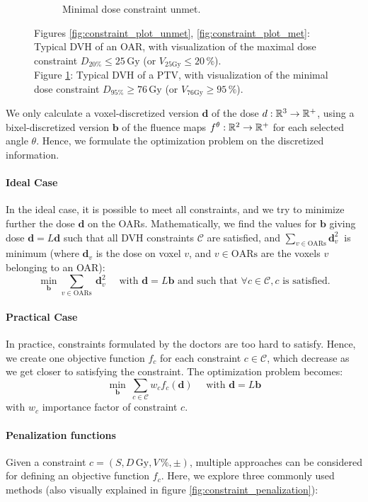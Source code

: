 \begin{figure}
\begin{subfigure}{0.32\textwidth}
		\caption{Minimal dose constraint unmet.}
		\label{fig:constraint_plot_min}
	\end{subfigure}
	\caption*{
		Figures \ref{fig:constraint_plot_unmet}, \ref{fig:constraint_plot_met}:
		Typical DVH of an OAR, with visualization of the maximal dose constraint $D_{20\%} \leq 25\,\text{Gy}$ (or $V_{25\text{Gy}} \leq 20\,\%$).\\
		Figure \ref{fig:constraint_plot_min}:
		Typical DVH of a PTV, with visualization of the minimal dose constraint $D_{95\%} \geq 76\,\text{Gy}$ (or $V_{76\text{Gy}} \geq 95\,\%$).
	}
	\label{fig:constraint_plot}
\end{figure}

We only calculate a voxel-discretized version $\mathbf{d}$ of the dose $d: \mathbb{R}^3 \to \mathbb{R}^+$, using a bixel-discretized version $\mathbf{b}$ of the fluence maps $f^\theta: \mathbb{R}^2 \to \mathbb{R}^+$ for each selected angle $\theta$.
Hence, we formulate the optimization problem on the discretized information.

\paragraph{Ideal Case}
In the ideal case, it is possible to meet all constraints, and we try to minimize further the dose $\mathbf{d}$ on the OARs.
Mathematically, we find the values for $\mathbf{b}$ giving dose $\mathbf{d} = L\mathbf{d}$ such that all DVH constraints $\mathcal{C}$ are satisfied, and $\sum_{v \in \text{OARs}} \mathbf{d}_v^2 \ $ is minimum (where $\mathbf{d}_v$ is the dose on voxel $v$, and $v \in \text{OARs}$ are the voxels $v$ belonging to an OAR):
$$
\min_{\mathbf{b}} \sum_{v \in \text{OARs}} \ \mathbf{d}_v^2
\quad \text{ with }
\mathbf{d} = L\mathbf{b}
\text{ and such that }
\forall c \in \mathcal{C}, c \text{ is satisfied.}
$$

\paragraph{Practical Case}
In practice, constraints formulated by the doctors are too hard to satisfy.
Hence, we create one objective function $f_c$ for each constraint $c \in \mathcal{C}$, which decrease as we get closer to satisfying the constraint.
The optimization problem becomes:
$$
\min_{\mathbf{b}} \ \sum_{c \in \mathcal{C}} w_c f_c(\mathbf{d})
\quad \text{ with }
\mathbf{d} = L\mathbf{b}
$$
with $w_c$ importance factor of constraint $c$.

\paragraph{Penalization functions}
Given a constraint $c = \left( S, D\,\text{Gy}, V\,\%, \pm \right)$, multiple approaches can be considered for defining an objective function \( f_c \).
Here, we explore three commonly used methods (also visually explained in figure \ref{fig:constraint_penalization}):

